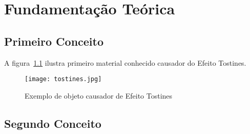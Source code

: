 \chapter{Fundamentação Teórica}

\blindtext 

\section[Conceito1]{Primeiro Conceito}

\blindtext

\blindtext[2]

\blindtext

A figura~\ref{fig-tostines} ilustra primeiro material conhecido causador do Efeito Tostines.

\begin{figure}[!htb]
	\centering
	\texttt{[image: tostines.jpg]}
	\caption{Exemplo de objeto causador de Efeito Tostines}
	\label{fig-tostines}
\end{figure}

\blindtext[2]

\section[Conceito2]{Segundo Conceito}

\blindtext

\blindtext[2]

\blindtext
		

